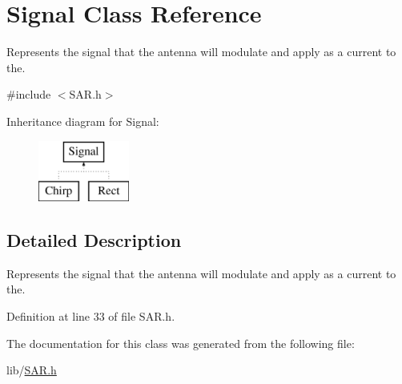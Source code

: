 \hypertarget{class_signal}{}\section{Signal Class Reference}
\label{class_signal}


Represents the signal that the antenna will modulate and apply as a current to the.  




{\ttfamily \#include $<$S\+A\+R.\+h$>$}

Inheritance diagram for Signal\+:\begin{figure}[H]
\begin{center}
\leavevmode
\includegraphics[height=2.000000cm]{class_signal}
\end{center}
\end{figure}


\subsection{Detailed Description}
Represents the signal that the antenna will modulate and apply as a current to the. 

Definition at line 33 of file S\+A\+R.\+h.



The documentation for this class was generated from the following file\+:\begin{DoxyCompactItemize}
\item 
lib/\hyperlink{_s_a_r_8h}{S\+A\+R.\+h}\end{DoxyCompactItemize}
